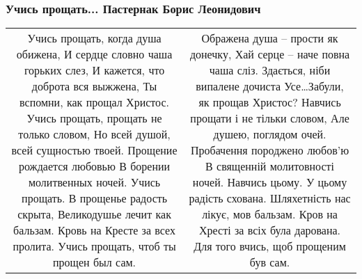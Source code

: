  
 
 

\subsubsection{Учись прощать... Пастернак Борис Леонидович}


\begin{longtable}{cc}

Учись прощать, когда душа обижена,
И сердце словно чаша горьких слез,
И кажется, что доброта вся выжжена,
Ты вспомни, как прощал Христос.
Учись прощать, прощать не только словом,
Но всей душой, всей сущностью твоей.
Прощение рождается любовью
В борении молитвенных ночей.
Учись прощать. В прощенье радость скрыта,
Великодушье лечит как бальзам.
Кровь на Кресте за всех пролита.
Учись прощать, чтоб ты прощен был сам.

&

Ображена душа – прости як донечку,
Хай серце – наче повна чаша сліз.
Здається, ніби випалене дочиста
Усе…Забули, як прощав Христос?
Навчись прощати і не тільки словом,
Але душею, поглядом очей.
Пробачення породжено любов'ю
В священній молитовності ночей.
Навчись цьому. У цьому радість схована.
Шляхетність нас лікує, мов бальзам.
Кров на Хресті за всіх була дарована.
Для того вчись, щоб прощеним був сам.
	
\end{longtable}
